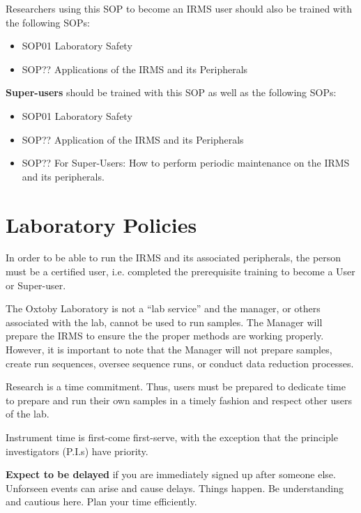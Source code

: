 \documentclass[12pt]{../SOP4_alpha}\usepackage[]{graphicx}\usepackage[]{color}
\begin{document}
\NP Researchers using this SOP to become an IRMS user should also be trained with the following SOPs:

\begin{itemize}
  \item SOP01 Laboratory Safety
  \item SOP?? Applications of the IRMS and its Peripherals
\end{itemize}

\NP \textbf{Super-users} should be trained with this SOP as well as the following SOPs:

\begin{itemize}
  \item SOP01 Laboratory Safety
  \item SOP?? Application of the IRMS and its Peripherals
  \item SOP?? For Super-Users: How to perform periodic maintenance on the IRMS and its peripherals. 
\end{itemize}

\section{Laboratory Policies}

\NP In order to be able to run the IRMS and its associated peripherals, the person must be a certified user, i.e. completed the prerequisite training to become a User or Super-user. 

\NP The Oxtoby Laboratory is not a ``lab service'' and the manager, or others associated with the lab, cannot be used to run samples. The Manager will prepare the IRMS to ensure the the proper methods are working properly. However, it is important to note that the Manager will not prepare samples, create run sequences, oversee sequence runs, or conduct data reduction processes. 

\NP Research is a time commitment. Thus, users must be prepared to dedicate time to prepare and run their own samples in a timely fashion and respect other users of the lab.

\NP Instrument time is first-come first-serve, with the exception that the principle investigators (P.I.s) have priority.

\NP \textbf{Expect to be delayed} if you are immediately signed up after someone else. Unforseen events can arise and cause delays. Things happen. Be understanding and cautious here. Plan your time efficiently.
\end{document}
